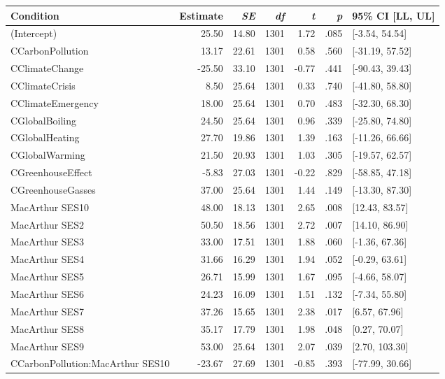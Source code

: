 \begin{table}[ht]
\centering
\begin{tabular}{lrrrrrl}
  \hline
Condition & Estimate & \textit{SE} & \textit{df} & \textit{t} & \textit{p} & 95\% CI [LL, UL] \\ 
  \hline
(Intercept) & 25.50 & 14.80 & 1301 & 1.72 & .085 & [-3.54, 54.54] \\ 
  CCarbonPollution & 13.17 & 22.61 & 1301 & 0.58 & .560 & [-31.19, 57.52] \\ 
  CClimateChange & -25.50 & 33.10 & 1301 & -0.77 & .441 & [-90.43, 39.43] \\ 
  CClimateCrisis & 8.50 & 25.64 & 1301 & 0.33 & .740 & [-41.80, 58.80] \\ 
  CClimateEmergency & 18.00 & 25.64 & 1301 & 0.70 & .483 & [-32.30, 68.30] \\ 
  CGlobalBoiling & 24.50 & 25.64 & 1301 & 0.96 & .339 & [-25.80, 74.80] \\ 
  CGlobalHeating & 27.70 & 19.86 & 1301 & 1.39 & .163 & [-11.26, 66.66] \\ 
  CGlobalWarming & 21.50 & 20.93 & 1301 & 1.03 & .305 & [-19.57, 62.57] \\ 
  CGreenhouseEffect & -5.83 & 27.03 & 1301 & -0.22 & .829 & [-58.85, 47.18] \\ 
  CGreenhouseGasses & 37.00 & 25.64 & 1301 & 1.44 & .149 & [-13.30, 87.30] \\ 
  MacArthur SES10 & 48.00 & 18.13 & 1301 & 2.65 & .008 & [12.43, 83.57] \\ 
  MacArthur SES2 & 50.50 & 18.56 & 1301 & 2.72 & .007 & [14.10, 86.90] \\ 
  MacArthur SES3 & 33.00 & 17.51 & 1301 & 1.88 & .060 & [-1.36, 67.36] \\ 
  MacArthur SES4 & 31.66 & 16.29 & 1301 & 1.94 & .052 & [-0.29, 63.61] \\ 
  MacArthur SES5 & 26.71 & 15.99 & 1301 & 1.67 & .095 & [-4.66, 58.07] \\ 
  MacArthur SES6 & 24.23 & 16.09 & 1301 & 1.51 & .132 & [-7.34, 55.80] \\ 
  MacArthur SES7 & 37.26 & 15.65 & 1301 & 2.38 & .017 & [6.57, 67.96] \\ 
  MacArthur SES8 & 35.17 & 17.79 & 1301 & 1.98 & .048 & [0.27, 70.07] \\ 
  MacArthur SES9 & 53.00 & 25.64 & 1301 & 2.07 & .039 & [2.70, 103.30] \\ 
  CCarbonPollution:MacArthur SES10 & -23.67 & 27.69 & 1301 & -0.85 & .393 & [-77.99, 30.66] \\ 

\end{tabular}
\end{table}
